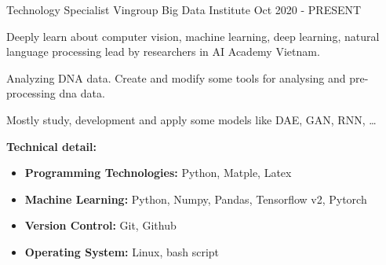 
\begin{cventries}
  \cventry
    {Technology Specialist} %
    {Vingroup Big Data Institute} %
    {}
    {Oct 2020 - PRESENT} %
    {
      \begin{cvitems} %
        \item {Deeply learn about computer vision, machine learning, deep learning, natural language processing lead by researchers in AI Academy Vietnam.}
        \item {Analyzing DNA data. Create and modify some tools for analysing and pre-processing dna data.}
        \item {Mostly study, development and apply some models like DAE, GAN, RNN, …}
        \item {\textbf{Technical detail:}}
        \begin{itemize}
            \item {\textbf{Programming Technologies:} Python, Matple, Latex}
            \item {\textbf{Machine Learning:} Python, Numpy, Pandas, Tensorflow v2, Pytorch}
            \item {\textbf{Version Control:} Git, Github}
            \item {\textbf{Operating System:} Linux, bash script}
        \end{itemize}
      \end{cvitems}
    }


\end{cventries}
